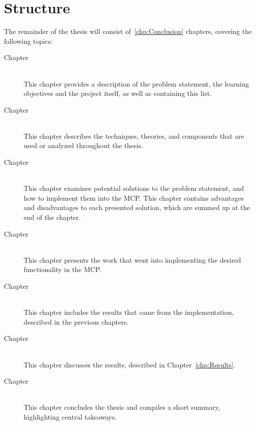 \section{Structure}
The remainder of the thesis will consist of~\ref{chp:Conclusion} chapters, covering the following topics:
\begin{description}
  \item[Chapter ]\ \\
  This chapter provides a description of the problem statement, the learning objectives and the project itself, as well as containing this list.
  \item[Chapter ]\ \\
  This chapter describes the techniques, theories, and components that are used or analyzed throughout the thesis.
  \item[Chapter ]\ \\
  This chapter examines potential solutions to the problem statement, and how to implement them into the MCP. This chapter contains advantages and disadvantages to each presented solution, which are summed up at the end of the chapter.
  \item[Chapter ]\ \\
  This chapter presents the work that went into implementing the desired functionality in the MCP.
  \item[Chapter ]\ \\
  This chapter includes the results that came from the implementation, described in the previous chapters.
  \item[Chapter ]\ \\
  This chapter discusses the results, described in Chapter~\ref{chp:Results}.
  \item[Chapter ]\ \\
  This chapter concludes the thesis and compiles a short summary, highlighting central takeaways.
\end{description}